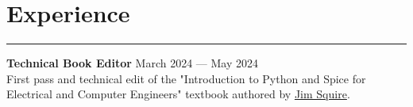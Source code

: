 \documentclass[a4paper,11pt]{article}
\begin{document}
\vspace{-0.7cm}
\section*{\hspace*{1em} Experience}
\vspace{-0.27cm}
\hrule
\vspace{0.2cm}
\textbf{\hspace*{1em}Technical Book Editor} 
\hfill March 2024 — May 2024 \\
First pass and technical edit of the "Introduction to Python and Spice for Electrical and Computer Engineers" textbook authored by \href{https://www.jimsquire.com/}{Jim Squire}. \\

\vspace{-0.7cm}
\end{document}
